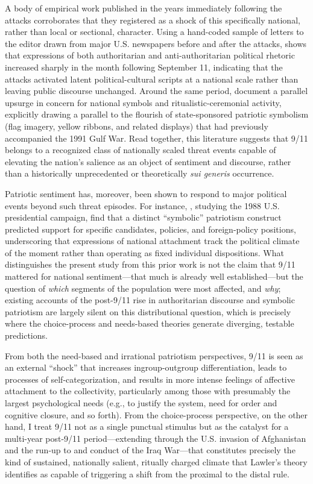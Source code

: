 \documentclass[12pt,letterpaper]{article}
\begin{document}
A body of empirical work published in the years immediately following the attacks corroborates that they registered as a shock of this specifically national, rather than local or sectional, character. Using a hand-coded sample of letters to the editor drawn from major U.S. newspapers before and after the attacks, \citet{perrin2005national} shows that expressions of both authoritarian and anti-authoritarian political rhetoric increased sharply in the month following September 11, indicating that the attacks activated latent political-cultural scripts at a national scale rather than leaving public discourse unchanged. Around the same period, \citet{schatz2007waving} document a parallel upsurge in concern for national symbols and ritualistic-ceremonial activity, explicitly drawing a parallel to the flourish of state-sponsored patriotic symbolism (flag imagery, yellow ribbons, and related displays) that had previously accompanied the 1991 Gulf War. Read together, this literature suggests that 9/11 belongs to a recognized class of nationally scaled threat events capable of elevating the nation's salience as an object of sentiment and discourse, rather than a historically unprecedented or theoretically \textit{sui generis} occurrence. 

Patriotic sentiment has, moreover, been shown to respond to major political events beyond such threat episodes. For instance, \citet{sullivan1992patriotism}, studying the 1988 U.S. presidential campaign, find that a distinct ``symbolic'' patriotism construct predicted support for specific candidates, policies, and foreign-policy positions, underscoring that expressions of national attachment track the political climate of the moment rather than operating as fixed individual dispositions. What distinguishes the present study from this prior work is not the claim that 9/11 mattered for national sentiment---that much is already well established---but the question of \textit{which} segments of the population were most affected, and \textit{why}; existing accounts of the post-9/11 rise in authoritarian discourse and symbolic patriotism are largely silent on this distributional question, which is precisely where the choice-process and needs-based theories generate diverging, testable predictions.

From both the need-based and irrational patriotism perspectives, 9/11 is seen as an external ``shock'' that increases ingroup-outgroup differentiation, leads to processes of self-categorization, and results in more intense feelings of affective attachment to the collectivity, particularly among those with presumably the largest psychological needs (e.g., to justify the system, need for order and cognitive closure, and so forth). From the choice-process perspective, on the other hand, I treat 9/11 not as a single punctual stimulus but as the catalyst for a multi-year post-9/11 period---extending through the U.S. invasion of Afghanistan and the run-up to and conduct of the Iraq War---that constitutes precisely the kind of sustained, nationally salient, ritually charged climate that Lawler's theory identifies as capable of triggering a shift from the proximal to the distal rule. 
\end{document}
